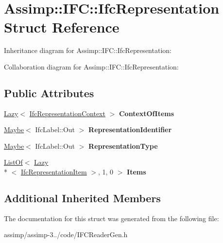 \hypertarget{struct_assimp_1_1_i_f_c_1_1_ifc_representation}{\section{Assimp\+:\+:I\+F\+C\+:\+:Ifc\+Representation Struct Reference}
\label{struct_assimp_1_1_i_f_c_1_1_ifc_representation}
}


Inheritance diagram for Assimp\+:\+:I\+F\+C\+:\+:Ifc\+Representation\+:


Collaboration diagram for Assimp\+:\+:I\+F\+C\+:\+:Ifc\+Representation\+:
\subsection*{Public Attributes}
\begin{DoxyCompactItemize}
\item 
\hypertarget{struct_assimp_1_1_i_f_c_1_1_ifc_representation_acf94736ff702545edc90d6f569f199d4}{\hyperlink{struct_assimp_1_1_s_t_e_p_1_1_lazy}{Lazy}$<$ \hyperlink{struct_assimp_1_1_i_f_c_1_1_ifc_representation_context}{Ifc\+Representation\+Context} $>$ {\bfseries Context\+Of\+Items}}\label{struct_assimp_1_1_i_f_c_1_1_ifc_representation_acf94736ff702545edc90d6f569f199d4}

\item 
\hypertarget{struct_assimp_1_1_i_f_c_1_1_ifc_representation_a4d95ebf2ce231fbf74c41c2b93255129}{\hyperlink{struct_assimp_1_1_s_t_e_p_1_1_maybe}{Maybe}$<$ Ifc\+Label\+::\+Out $>$ {\bfseries Representation\+Identifier}}\label{struct_assimp_1_1_i_f_c_1_1_ifc_representation_a4d95ebf2ce231fbf74c41c2b93255129}

\item 
\hypertarget{struct_assimp_1_1_i_f_c_1_1_ifc_representation_abf28ceab7a08f61f429d4272d57452a2}{\hyperlink{struct_assimp_1_1_s_t_e_p_1_1_maybe}{Maybe}$<$ Ifc\+Label\+::\+Out $>$ {\bfseries Representation\+Type}}\label{struct_assimp_1_1_i_f_c_1_1_ifc_representation_abf28ceab7a08f61f429d4272d57452a2}

\item 
\hypertarget{struct_assimp_1_1_i_f_c_1_1_ifc_representation_a0b075fb798d6fd8538d60dfe0a0424fd}{\hyperlink{struct_assimp_1_1_s_t_e_p_1_1_list_of}{List\+Of}$<$ \hyperlink{struct_assimp_1_1_s_t_e_p_1_1_lazy}{Lazy}\\*
$<$ \hyperlink{struct_assimp_1_1_i_f_c_1_1_ifc_representation_item}{Ifc\+Representation\+Item} $>$, 1, 0 $>$ {\bfseries Items}}\label{struct_assimp_1_1_i_f_c_1_1_ifc_representation_a0b075fb798d6fd8538d60dfe0a0424fd}

\end{DoxyCompactItemize}
\subsection*{Additional Inherited Members}


The documentation for this struct was generated from the following file\+:\begin{DoxyCompactItemize}
\item 
assimp/assimp-\/3../code/I\+F\+C\+Reader\+Gen.\+h\end{DoxyCompactItemize}
